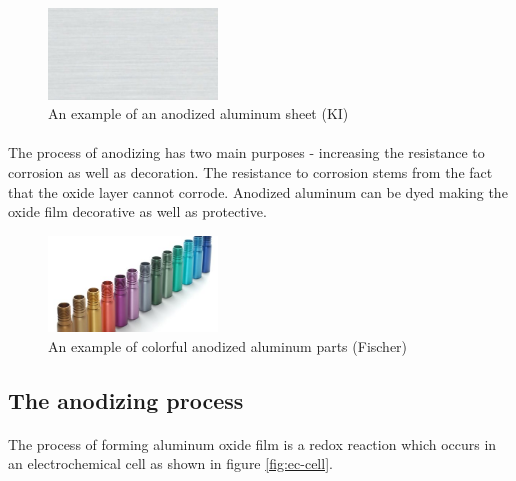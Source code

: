 \documentclass[a4paper]{article}
\begin{document}
\begin{figure}[ht]
  \centering
  \includegraphics[width=0.4\textwidth]{img/clralu}
  \caption{An example of an anodized aluminum sheet (KI)}
  \label{fig:clr-alu-anodized}
\end{figure}

\paragraph*{}
The process of anodizing has two main purposes - increasing the resistance to
corrosion as well as decoration. The resistance to corrosion stems from the
fact that the oxide layer cannot corrode. Anodized aluminum can be dyed making
the oxide film decorative as well as protective.

\begin{figure}[ht]
  \centering
  \includegraphics[width=0.4\textwidth]{img/coloralu}
  \caption{An example of colorful anodized aluminum parts (Fischer)}
  \label{fig:color-alu-anodized}
\end{figure}

\subsection{The anodizing process}

\paragraph*{}
The process of forming aluminum oxide film is a redox reaction which occurs in
an electrochemical cell as shown in figure \ref{fig:ec-cell}.
\end{document}
